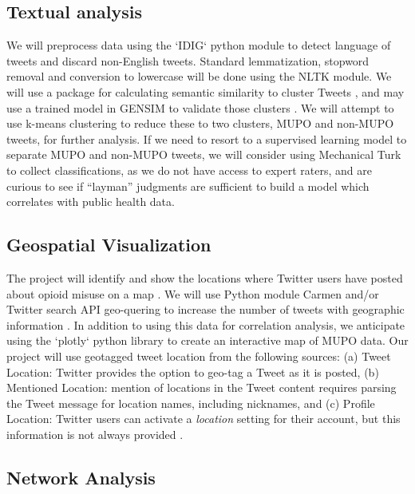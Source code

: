\documentclass[sigconf]{acmart}
\begin{document}
\subsection{Textual analysis} 
We will preprocess data using the `IDIG` python module to detect language of 
tweets and discard non-English tweets. Standard lemmatization, stopword removal 
and conversion to lowercase will be done using the NLTK module. We will use 
a package for calculating semantic similarity to cluster Tweets \cite{chary17}, 
and may use a trained model in GENSIM to validate those clusters \cite{sarker17}. 
We will attempt to use k-means clustering to reduce these to two clusters, 
MUPO and non-MUPO tweets, for further analysis. If we need to resort to a 
supervised learning model to separate MUPO and non-MUPO tweets, we will 
consider using Mechanical Turk to collect classifications, as we do not have 
access to expert raters, and are curious to see if “layman” judgments are 
sufficient to build a model which correlates with public health data. 

\subsection{Geospatial Visualization}

The project will identify and show the locations where Twitter users have 
posted about opioid misuse on a map \cite{twittergeo}. We will use Python 
module Carmen and/or Twitter search API geo-quering to increase the number of 
tweets with geographic information \cite{dredze13}. In addition to using this 
data for correlation analysis, we anticipate using the `plotly` python library 
to create an interactive map of MUPO data. Our project will use geotagged tweet 
location from the following sources: (a) Tweet Location: Twitter provides the 
option to geo-tag a Tweet as it is posted, (b) Mentioned Location: mention of 
locations in the Tweet content requires parsing the Tweet message for location 
names, including nicknames, and (c) Profile Location: Twitter users can 
activate a \emph{location} setting for their account, but this information 
is not always provided \cite{widener14}. 

\subsection{Network Analysis} 
\end{document}
